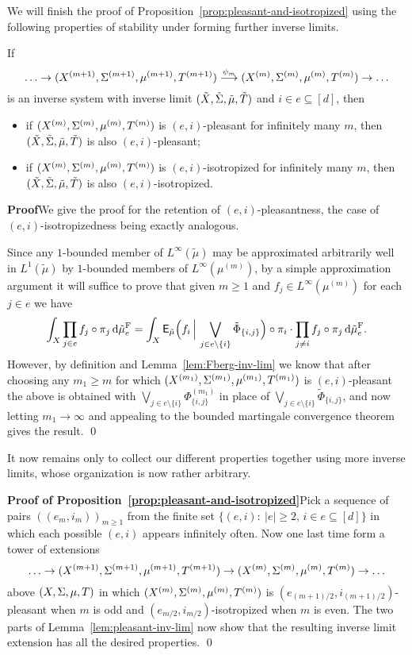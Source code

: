 \documentclass[12pt]{article}
\begin{document}
We will finish the proof of
Proposition~\ref{prop:pleasant-and-isotropized} using the following
properties of stability under forming further inverse limits.

\begin{lem}\label{lem:pleasant-inv-lim} If
\[\ldots\to(X^{(m+1)},\S^{(m+1)},\mu^{(m+1)},T^{(m+1)})\stackrel{\psi_m}{\longrightarrow}(X^{(m)},\S^{(m)},\mu^{(m)},T^{(m)})\to\ldots\]
is an inverse system with inverse limit
$(\tilde{X},\tilde{\S},\tilde{\mu},\tilde{T})$ and $i \in e
\subseteq [d]$, then
\begin{itemize}
\item if $(X^{(m)},\S^{(m)},\mu^{(m)},T^{(m)})$ is $(e,i)$-pleasant for
infinitely many $m$, then
$(\tilde{X},\tilde{\S},\tilde{\mu},\tilde{T})$ is also
$(e,i)$-pleasant;
\item if $(X^{(m)},\S^{(m)},\mu^{(m)},T^{(m)})$ is $(e,i)$-isotropized for
infinitely many $m$, then
$(\tilde{X},\tilde{\S},\tilde{\mu},\tilde{T})$ is also
$(e,i)$-isotropized.
\end{itemize}
\end{lem}

\textbf{Proof}\quad We give the proof for the retention of
$(e,i)$-pleasantness, the case of $(e,i)$-isotropizedness being
exactly analogous.

Since any $1$-bounded member of $L^\infty(\tilde{\mu})$ may be
approximated arbitrarily well in $L^1(\tilde{\mu})$ by $1$-bounded
members of $L^\infty(\mu^{(m)})$, by a simple approximation argument
it will suffice to prove that given $m\geq 1$ and $f_j \in
L^\infty(\mu^{(m)})$ for each $j\in e$ we have
\[\int_X \prod_{j\in e}f_j\circ\pi_j\,\d\tilde{\mu}^{\rm{F}}_e = \int_X \sfE_{\tilde{\mu}}\Big(f_i\,\Big|\,\bigvee_{j\in e\setminus\{i\}}\tilde{\Phi}_{\{i,j\}}\Big)\circ\pi_i\cdot \prod_{j\neq i}f_j\circ\pi_j\,\d\tilde{\mu}^{\rm{F}}_e.\]
However, by definition and Lemma~\ref{lem:Fberg-inv-lim} we know
that after choosing any $m_1 \geq m$ for which
$(X^{(m_1)},\S^{(m_1)},\mu^{(m_1)},T^{(m_1)})$ is $(e,i)$-pleasant
the above is obtained with $\bigvee_{j\in
e\setminus\{i\}}\Phi^{(m_1)}_{\{i,j\}}$ in place of $\bigvee_{j\in
e\setminus\{i\}}\tilde{\Phi}_{\{i,j\}}$, and now letting $m_1 \to
\infty$ and appealing to the bounded martingale convergence theorem
gives the result. \qed

It now remains only to collect our different properties together
using more inverse limits, whose organization is now rather
arbitrary.

\textbf{Proof of
Proposition~\ref{prop:pleasant-and-isotropized}}\quad Pick a
sequence of pairs $((e_m,i_m))_{m\geq 1}$ from the finite set
$\{(e,i):\ |e|\geq 2,\,i \in e \subseteq [d]\}$ in which each
possible $(e,i)$ appears infinitely often. Now one last time form a
tower of extensions
\[\ldots\to(X^{(m+1)},\S^{(m+1)},\mu^{(m+1)},T^{(m+1)})\to (X^{(m)},\S^{(m)},\mu^{(m)},T^{(m)})\to\ldots\]
above $(X,\S,\mu,T)$ in which $(X^{(m)},\S^{(m)},\mu^{(m)},T^{(m)})$
is $(e_{(m+1)/2},i_{(m+1)/2})$-pleasant when $m$ is odd and
$(e_{m/2},i_{m/2})$-isotropized when $m$ is even.  The two parts of
Lemma~\ref{lem:pleasant-inv-lim} now show that the resulting inverse
limit extension has all the desired properties. \qed
\end{document}
